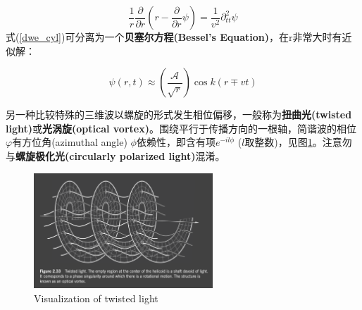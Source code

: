 \documentclass[12pt]{ctexart}%
\begin{document}
\begin{equation}
    \frac{1}{r} \frac{\partial}{\partial r}\left(r -\frac{\partial}{\partial r}\psi\right)=\frac{1}{v^2}\partial^2_{tt}\psi
    \label{dwe_cyl}
\end{equation}
式(\ref{dwe_cyl})可分离为一个\textbf{贝塞尔方程(Bessel's Equation)}，在r非常大时有近似解：
\begin{framed}
    \begin{equation}
        \psi(r,t)\approx \left(\frac{\mathscr{A}}{\sqrt{r}}\right)\cos{k(r\mp vt)}
    \end{equation}
\end{framed}
另一种比较特殊的三维波以螺旋的形式发生相位偏移，一般称为\textbf{扭曲光(twisted light)}或\textbf{光涡旋(optical vortex)}。围绕平行于传播方向的一根轴，简谐波的相位$\varphi$有方位角(azimuthal angle) $\phi$依赖性，即含有项$e^{-il\phi}$ ($l$取整数)，见图\ref{twisted_wave}。注意勿与\textbf{螺旋极化光(circularly polarized light)}混淆。
\begin{figure}
    \centering
    \includegraphics[width=0.6\textwidth]{Image/1_twisted_wave.png}
    \caption{Visualization of twisted light}
    \label{twisted_wave}
\end{figure}
\end{document}
